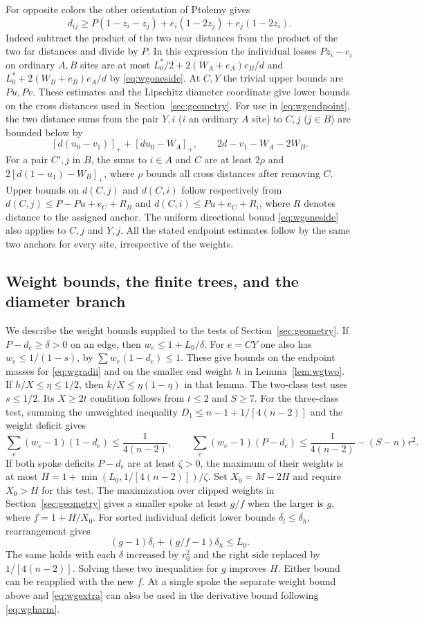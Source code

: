 \documentclass[11pt,a4paper]{article}
\theoremstyle{definition}
\begin{document}
For opposite colors the other orientation of Ptolemy gives
\[
 d_{ij}\ge P(1-z_i-z_j)+e_i(1-2z_j)+e_j(1-2z_i).
\]
Indeed subtract the product of the two near distances from the product
of the two far distances and divide by $P$. In this expression the
individual losses $Pz_i-e_i$ on ordinary $A,B$ sites are at most
$L_0^*/2+2(W_A+e_A)e_B/d$ and $L_0^*+2(W_B+e_B)e_A/d$
by \eqref{eq:wgoneside}. At $C,Y$ the trivial upper bounds are
$Pu,Pv$. These estimates and the Lipschitz diameter coordinate
give lower bounds on the cross distances used in Section~\ref{sec:geometry}.
For use in \eqref{eq:wgendpoint}, the two distance sums from the
pair $Y,i$ ($i$ an ordinary $A$ site) to $C,j$ ($j\in B$)
are bounded below by
\[
 [d(u_0-v_1)]_++[du_0-W_A]_+,\qquad
 2d-v_1-W_A-2W_B .
\]
For a pair $C',j$ in $B$, the sums to $i\in A$ and $C$ are at
least $2\rho$ and $2[d(1-u_1)-W_B]_+$, where $\rho$ bounds all
cross distances after removing $C$. Upper bounds on $d(C,j)$ and
$d(C,i)$ follow respectively from
$d(C,j)\le P-Pu+e_C+R_B$ and $d(C,i)\le Pu+e_C+R_i$,
where $R$ denotes distance to the assigned anchor. The uniform
directional bound \eqref{eq:wgoneside} also applies to $C,j$ and
$Y,j$. All the stated endpoint estimates follow by the same two
anchors for every site, irrespective of the weights.

\subsection{Weight bounds, the finite trees, and the diameter branch}

We describe the weight bounds supplied to the tests of
Section~\ref{sec:geometry}. If $P-d_e\ge\delta>0$ on an edge,
then $w_e\le1+L_0/\delta$. For $e=CY$ one also has
$w_e\le1/(1-s)$, by $\sum w_e(1-d_e)\le1$.
These give bounds on the endpoint masses for \eqref{eq:wgradii}
and on the smaller end weight $h$ in Lemma~\ref{lem:wgtwo}. If
$h/X\le\eta\le1/2$, then $k/X\le\eta(1-\eta)$ in that lemma.
The two-class test uses $s\le1/2$. Its $X\ge2t$ condition follows
from $t\le2$ and $S\ge7$. For the three-class test,
summing the unweighted inequality $D_1\le n-1+1/[4(n-2)]$ and the
weight deficit gives
\begin{equation}
 \sum_e(w_e-1)(1-d_e)\le\frac1{4(n-2)},\qquad
 \sum_e(w_e-1)(P-d_e)\le\frac1{4(n-2)}-(S-n)r^2 .
 \label{eq:wgextra}
\end{equation}
If both spoke deficits $P-d_e$ are at least $\zeta>0$, the maximum
of their weights is at most $H=1+\min(L_0,1/[4(n-2)])/\zeta$.
Set $X_0=M-2H$ and require $X_0>H$ for this test.
The maximization over clipped weights in Section~\ref{sec:geometry}
gives a smaller spoke at least $g/f$ when the larger is $g$,
where $f=1+H/X_0$. For sorted individual deficit lower bounds
$\delta_l\le\delta_h$, rearrangement gives
\[
 (g-1)\delta_l+(g/f-1)\delta_h\le L_0 .
\]
The same holds with each $\delta$ increased by $r_0^2$ and the
right side replaced by $1/[4(n-2)]$. Solving these two inequalities
for $g$ improves $H$. Either bound can be reapplied with the
new $f$. At a single spoke the separate weight bound above and
\eqref{eq:wgextra} can also be used in the derivative bound following
\eqref{eq:wgharm}.
\end{document}
